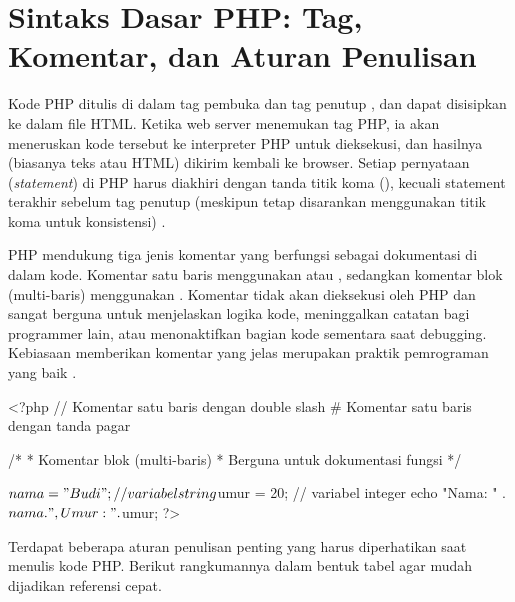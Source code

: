 ﻿\section{Sintaks Dasar PHP: Tag, Komentar, dan Aturan Penulisan}

Kode PHP ditulis di dalam tag pembuka  dan tag penutup , dan dapat disisipkan ke dalam file HTML. Ketika web server menemukan tag PHP, ia akan meneruskan kode tersebut ke interpreter PHP untuk dieksekusi, dan hasilnya (biasanya teks atau HTML) dikirim kembali ke browser. Setiap pernyataan (\textit{statement}) di PHP harus diakhiri dengan tanda titik koma (\code{;}), kecuali statement terakhir sebelum tag penutup (meskipun tetap disarankan menggunakan titik koma untuk konsistensi) \cite{phpManual}.

PHP mendukung tiga jenis komentar yang berfungsi sebagai dokumentasi di dalam kode. Komentar satu baris menggunakan \code{//} atau \code{\#}, sedangkan komentar blok (multi-baris) menggunakan . Komentar tidak akan dieksekusi oleh PHP dan sangat berguna untuk menjelaskan logika kode, meninggalkan catatan bagi programmer lain, atau menonaktifkan bagian kode sementara saat debugging. Kebiasaan memberikan komentar yang jelas merupakan praktik pemrograman yang baik \cite{phpRightWay}.

\begin{webcode}[language=PHP, caption={Tag PHP dan tiga jenis komentar}]
<?php
// Komentar satu baris dengan double slash
# Komentar satu baris dengan tanda pagar

/*
 * Komentar blok (multi-baris)
 * Berguna untuk dokumentasi fungsi
 */

$nama = "Budi";   // variabel string
$umur = 20;        // variabel integer
echo "Nama: " . $nama . ", Umur: " . $umur;
?>
\end{webcode}

Terdapat beberapa aturan penulisan penting yang harus diperhatikan saat menulis kode PHP. Berikut rangkumannya dalam bentuk tabel agar mudah dijadikan referensi cepat.

